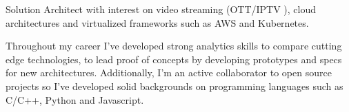 \par{
    Solution Architect with interest on video streaming (OTT/IPTV ), cloud architectures and virtualized frameworks such as AWS and Kubernetes.

    Throughout my career I've developed strong analytics skills to compare cutting edge technologies, to lead proof of concepts by developing prototypes and specs for new architectures. 
    Additionally, I'm an active collaborator to open source projects so I've developed solid backgrounds on programming languages such as C/C++, Python and Javascript.
}